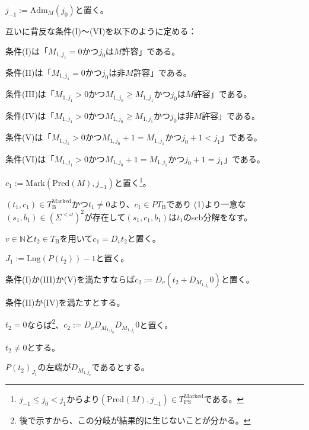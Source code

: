 \documentclass[dvipdfmx,uplatex]{jsarticle}
\theoremstyle{customnonumberbreakfortheorem}
\theoremstyle{customnonumberbreakforproof}
\begin{document}
\begin{nenumerate}
\begin{nenumerate}
\begin{nenumerate}
			\item \(j_{-1} := \textrm{Adm}_M(j_0)\)と置く。
			\item 互いに背反な条件(I)～(VI)を以下のように定める：
			\begin{nenumerate}
				\item 条件(I)は「\(M_{1,j_1} = 0\)かつ\(j_0\)は\(M\)許容」である。
				\item 条件(II)は「\(M_{1,j_1} = 0\)かつ\(j_0\)は非\(M\)許容」である。
				\item 条件(III)は「\(M_{1,j_1} > 0\)かつ\(M_{1,j_0} \geq M_{1,j_1}\)かつ\(j_0\)は\(M\)許容」である。
				\item 条件(IV)は「\(M_{1,j_1} > 0\)かつ\(M_{1,j_0} \geq M_{1,j_1}\)かつ\(j_0\)は非\(M\)許容」である。
				\item 条件(V)は「\(M_{1,j_1} > 0\)かつ\(M_{1,j_0}+1 = M_{1,j_1}\)かつ\(j_0+1 < j_1\)」である。
				\item 条件(VI)は「\(M_{1,j_1} > 0\)かつ\(M_{1,j_0}+1 = M_{1,j_1}\)かつ\(j_0+1 = j_1\)」である。
			\end{nenumerate}
			\item \(c_1 := \textrm{Mark}(\textrm{Pred}(M),j_{-1})\)と置く\footnote{\(j_{-1} \leq j_0 < j_1\)からより\((\textrm{Pred}(M),j_{-1}) \in T_{\textrm{PS}}^{\textrm{Marked}}\)である。}。
			\item \((t_1,c_1) \in T_{\textrm{B}}^\textrm{Marked}\)かつ\(t_1 \neq 0\)より、\(c_1 \in PT_{\textrm{B}}\)であり (1)より一意な\((s_1,b_1) \in (\Sigma^{< \omega})^2\)が存在して\((s_1,c_1,b_1)\)は\(t_1\)のscb分解をなす。
			\item \(v \in \mathbb{N}\)と\(t_2 \in T_{\textrm{B}}\)を用いて\(c_1 = D_v t_2\)と置く。
			\item \(J_1 := \textrm{Lng}(P(t_2))-1\)と置く。
			\item 条件(I)か(III)か(V)を満たすならば\(c_2 := D_v(t_2 + D_{M_{1,j_1}} 0)\)と置く。
			\item 条件(II)か(IV)を満たすとする。
			\begin{nenumerate}
				\item \(t_2 = 0\)ならば\footnote{後で示すから、この分岐が結果的に生じないことが分かる。}、\(c_2 := D_v D_{M_{1,j_0}} D_{M_{1,j_1}} 0\)と置く。
				\item \(t_2 \neq 0\)とする。
				\begin{nenumerate}
					\item \(P(t_2)_{J_1}\)の左端が\(D_{M_{1,j_0}}\)であるとする。

\end{nenumerate}
\end{nenumerate}
\end{nenumerate}
\end{nenumerate}
\end{nenumerate}
\end{document}
